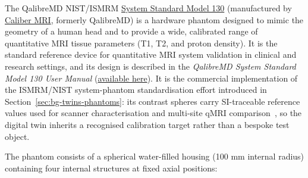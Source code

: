 The QalibreMD NIST/ISMRM
\href{https://qmri.com/product/premium-system-phantom/}{System Standard
Model 130} (manufactured by \href{https://qmri.com}{Caliber MRI},
formerly QalibreMD) is a hardware phantom designed to mimic the geometry
of a human head and to provide a wide, calibrated range of quantitative
MRI tissue parameters (T1, T2, and proton density). It is the standard
reference device for quantitative MRI system validation in clinical and
research settings, and its design is described in the \emph{QalibreMD
System Standard Model 130 User Manual}
(\href{https://github.com/ArthurAllilaire/RLxMRI/blob/main/QalibreMD_NIST_ISMRM_System_Standard_Model_130_T1_T2_PD_User_Manual.pdf}{available
here}). It is the commercial implementation of the ISMRM/NIST
system-phantom standardisation effort introduced in
Section~\ref{sec:bg-twins-phantoms}: its contrast spheres carry
SI-traceable reference values used for scanner characterisation and
multi-site qMRI
comparison~\cite{russek_system_phantom_characterization_2020,keenan_phantoms_2024},
so the digital twin inherits a recognised calibration target rather than a
bespoke test object.

The phantom consists of a spherical water-filled housing (100 mm
internal radius) containing four internal structures at fixed axial
positions:

